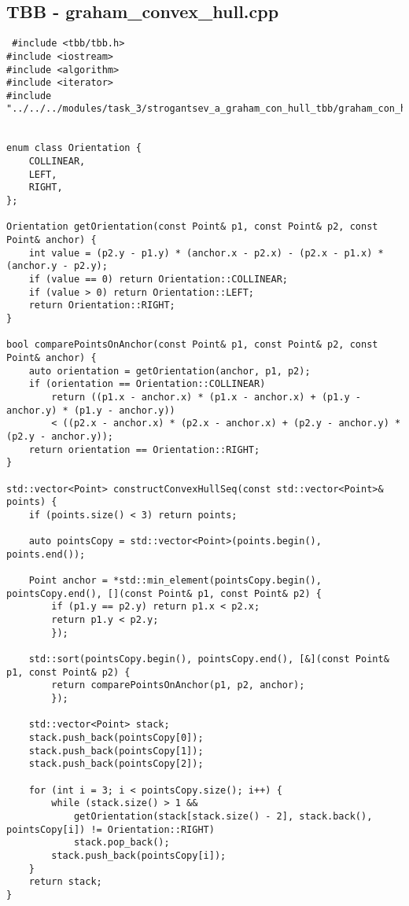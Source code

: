 \documentclass[14pt, a4paper]{extarticle}
\begin{document}
    \subsection{TBB - graham\_convex\_hull.cpp}
  \begin{lstlisting}
 #include <tbb/tbb.h>
#include <iostream>
#include <algorithm>
#include <iterator>
#include "../../../modules/task_3/strogantsev_a_graham_con_hull_tbb/graham_con_hull_tbb.h"


enum class Orientation {
    COLLINEAR,
    LEFT,
    RIGHT,
};

Orientation getOrientation(const Point& p1, const Point& p2, const Point& anchor) {
    int value = (p2.y - p1.y) * (anchor.x - p2.x) - (p2.x - p1.x) * (anchor.y - p2.y);
    if (value == 0) return Orientation::COLLINEAR;
    if (value > 0) return Orientation::LEFT;
    return Orientation::RIGHT;
}

bool comparePointsOnAnchor(const Point& p1, const Point& p2, const Point& anchor) {
    auto orientation = getOrientation(anchor, p1, p2);
    if (orientation == Orientation::COLLINEAR)
        return ((p1.x - anchor.x) * (p1.x - anchor.x) + (p1.y - anchor.y) * (p1.y - anchor.y))
        < ((p2.x - anchor.x) * (p2.x - anchor.x) + (p2.y - anchor.y) * (p2.y - anchor.y));
    return orientation == Orientation::RIGHT;
}

std::vector<Point> constructConvexHullSeq(const std::vector<Point>& points) {
    if (points.size() < 3) return points;

    auto pointsCopy = std::vector<Point>(points.begin(), points.end());

    Point anchor = *std::min_element(pointsCopy.begin(), pointsCopy.end(), [](const Point& p1, const Point& p2) {
        if (p1.y == p2.y) return p1.x < p2.x;
        return p1.y < p2.y;
        });

    std::sort(pointsCopy.begin(), pointsCopy.end(), [&](const Point& p1, const Point& p2) {
        return comparePointsOnAnchor(p1, p2, anchor);
        });

    std::vector<Point> stack;
    stack.push_back(pointsCopy[0]);
    stack.push_back(pointsCopy[1]);
    stack.push_back(pointsCopy[2]);

    for (int i = 3; i < pointsCopy.size(); i++) {
        while (stack.size() > 1 &&
            getOrientation(stack[stack.size() - 2], stack.back(), pointsCopy[i]) != Orientation::RIGHT)
            stack.pop_back();
        stack.push_back(pointsCopy[i]);
    }
    return stack;
}


\end{lstlisting}
\end{document}
